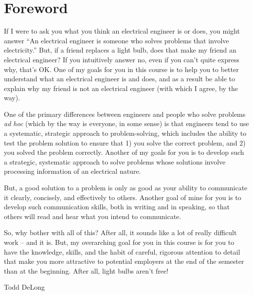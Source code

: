 
\chapter*{Foreword}

If I were to ask you what you think an electrical engineer is or does, you might answer “An electrical engineer is someone who solves problems that involve electricity.” But, if a friend replaces a light bulb, does that make my friend an electrical engineer? If you intuitively answer no, even if you can’t quite express why, that’s OK. One of my goals for you in this course is to help you to better understand what an electrical engineer is and does, and as a result be able to explain why my friend is not an electrical engineer (with which I agree, by the way).

One of the primary differences between engineers and people who solve problems \textit{ad hoc} (which by the way is everyone, in some sense) is that engineers tend to use a systematic, strategic approach to problem-solving, which includes the ability to test the problem solution to ensure that 1) you solve the correct problem, and 2) you solved the problem correctly. Another of my goals for you is to develop such a strategic, systematic approach to solve problems whose solutions involve processing information of an electrical nature.

But, a good solution to a problem is only as good as your ability to communicate it clearly, concisely, and effectively to others. Another goal of mine for you is to develop such communication skills, both in writing and in speaking, so that others will read and hear what you intend to communicate.

So, why bother with all of this?  After all, it sounds like a lot of really difficult work – and it is. But, my overarching goal for you in this course is for you to have the knowledge, skills, and the habit of careful, rigorous attention to detail that make you more attractive to potential employers at the end of the semester than at the beginning.  After all, light bulbs aren’t free!

\hfill \textemdash Todd DeLong